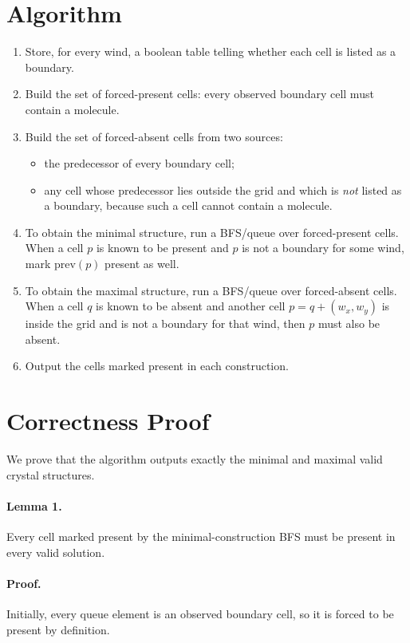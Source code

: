 \documentclass[11pt]{article}
\begin{document}
\section*{Algorithm}

\begin{enumerate}[leftmargin=*]
    \item Store, for every wind, a boolean table telling whether each cell is listed as a boundary.
    \item Build the set of forced-present cells: every observed boundary cell must contain a molecule.
    \item Build the set of forced-absent cells from two sources:
    \begin{itemize}[leftmargin=*]
        \item the predecessor of every boundary cell;
        \item any cell whose predecessor lies outside the grid and which is \emph{not} listed as a boundary,
        because such a cell cannot contain a molecule.
    \end{itemize}
    \item To obtain the minimal structure, run a BFS/queue over forced-present cells. When a cell $p$ is known
    to be present and $p$ is not a boundary for some wind, mark $\mathrm{prev}(p)$ present as well.
    \item To obtain the maximal structure, run a BFS/queue over forced-absent cells. When a cell $q$ is known
    to be absent and another cell $p=q+(w_x,w_y)$ is inside the grid and is not a boundary for that wind,
    then $p$ must also be absent.
    \item Output the cells marked present in each construction.
\end{enumerate}

\section*{Correctness Proof}

We prove that the algorithm outputs exactly the minimal and maximal valid crystal structures.

\paragraph{Lemma 1.}
Every cell marked present by the minimal-construction BFS must be present in every valid solution.

\paragraph{Proof.}
Initially, every queue element is an observed boundary cell, so it is forced to be present by definition.
\end{document}

